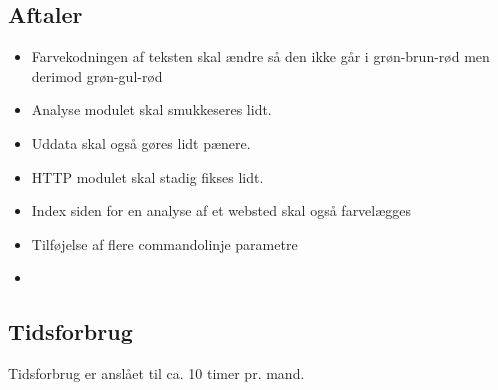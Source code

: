 \documentclass[a4paper,10pt,draft]{article}
\begin{document}
\subsection{Aftaler}
\begin{itemize}
 \item Farvekodningen af teksten skal ændre så den ikke går i grøn-brun-rød men derimod grøn-gul-rød
\item Analyse modulet skal smukkeseres lidt.
\item Uddata skal også gøres lidt pænere.
\item HTTP modulet skal stadig fikses lidt.
\item Index siden for en analyse af et websted skal også farvelægges
\item Tilføjelse af flere commandolinje parametre
\item 
\end{itemize}

\subsection{Tidsforbrug}
Tidsforbrug er anslået til ca. 10 timer pr. mand.
\end{document}
